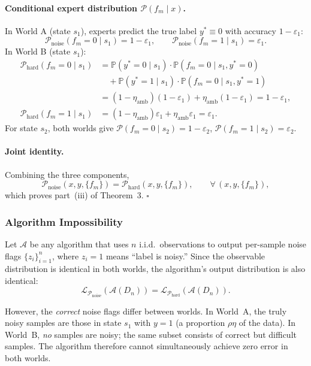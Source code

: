 \paragraph{Conditional expert distribution $\mathcal{P}(f_m\mid x)$.}
In World A (state $s_1$), experts predict the true label $y^*\equiv0$ with
accuracy $1-\varepsilon_1$:
\[
\mathcal{P}_{\text{noise}}(f_m=0\mid s_1)=1-\varepsilon_1,\qquad
\mathcal{P}_{\text{noise}}(f_m=1\mid s_1)=\varepsilon_1.
\]
In World B (state $s_1$):
\[
\begin{aligned}
\mathcal{P}_{\text{hard}}(f_m=0\mid s_1)
&= \mathbb{P}(y^*=0\mid s_1)\cdot\mathbb{P}(f_m=0\mid s_1,y^*=0)\\
&\quad + \mathbb{P}(y^*=1\mid s_1)\cdot\mathbb{P}(f_m=0\mid s_1,y^*=1)\\
&= (1-\eta_{\text{amb}})(1-\varepsilon_1) + \eta_{\text{amb}}(1-\varepsilon_1) = 1-\varepsilon_1,\\[4pt]
\mathcal{P}_{\text{hard}}(f_m=1\mid s_1)
&= (1-\eta_{\text{amb}})\varepsilon_1 + \eta_{\text{amb}}\varepsilon_1 = \varepsilon_1.
\end{aligned}
\]
For state $s_2$, both worlds give $\mathcal{P}(f_m=0\mid s_2)=1-\varepsilon_2$,
$\mathcal{P}(f_m=1\mid s_2)=\varepsilon_2$.

\paragraph{Joint identity.}
Combining the three components,
\[
\mathcal{P}_{\text{noise}}(x,y,\{f_m\})
= \mathcal{P}_{\text{hard}}(x,y,\{f_m\}),
\qquad \forall\,(x,y,\{f_m\}),
\]
which proves part~(iii) of Theorem~3. \hfill$\square$

\subsubsection{Algorithm Impossibility}
\label{sec:thm3_impossibility}

Let $\mathcal{A}$ be any algorithm that uses $n$ i.i.d.\ observations to
output per-sample noise flags $\{z_i\}_{i=1}^n$, where $z_i=1$ means ``label
is noisy.''  Since the observable distribution is identical in both worlds,
the algorithm's output distribution is also identical:
\[
\mathcal{L}_{\mathcal{P}_{\text{noise}}}(\mathcal{A}(D_n))
= \mathcal{L}_{\mathcal{P}_{\text{hard}}}(\mathcal{A}(D_n)).
\]

However, the \emph{correct} noise flags differ between worlds.  In World~A,
the truly noisy samples are those in state $s_1$ with $y=1$ (a proportion
$\rho\eta$ of the data).  In World~B, \emph{no} samples are noisy; the same
subset consists of correct but difficult samples.  The algorithm therefore
cannot simultaneously achieve zero error in both worlds.

